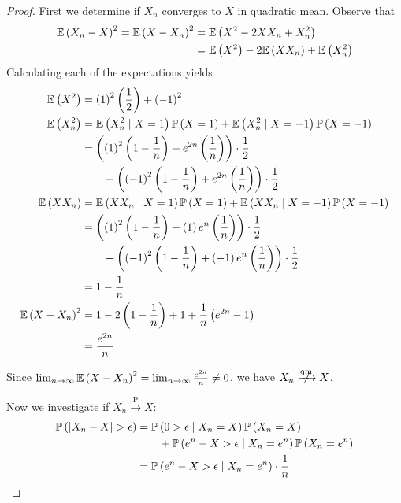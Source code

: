 \documentclass[a4paper]{article}
\begin{document}
\begin{proof}[Proof] 
First we determine if \(X_{n}\) converges to \(X\) in quadratic mean. Observe that
\begin{align*}
	\mathbb{E}\left( X_{n} - X \right)^{2} = \mathbb{E}\left( X - X_{n} \right)^{2} 	& = \mathbb{E}\left( X^{2} - 2 X X_{n} + X^{2}_{n} \right) \\	
	 & = \mathbb{E}\left( X^{2} \right) - 2 \mathbb{E}\left( X X_{n} \right) + \mathbb{E}\left( X^{2}_{n} \right) \\ 
\end{align*}
Calculating each of the expectations yields
\begin{align*}
	\mathbb{E}\left( X^{2} \right) & = \left( 1 \right)^{2} \left( \frac{1}{2} \right) + \left( -1 \right)^{2}  \\
	\mathbb{E}\left( X^{2}_{n} \right) & = \mathbb{E}\left( X^{2}_{n} \mid X = 1 \right) \mathbb{P}\left( X = 1 \right) + \mathbb{E}\left( X^{2}_{n} \mid X = -1 \right) \mathbb{P}\left( X = -1 \right) \\
		   & = \left( \left( 1 \right)^{2} \left( 1 - \frac{1}{n} \right) + e^{2n} \left( \frac{1}{n} \right)  \right) \cdot \frac{1}{2} \\
		   & \qquad + \left( \left( -1 \right)^{2} \left( 1 - \frac{1}{n} \right) + e^{2n} \left( \frac{1}{n} \right)  \right) \cdot \frac{1}{2} \\
	\mathbb{E}\left( X X_{n} \right) & = \mathbb{E}\left( X X_{n} \mid X = 1 \right) \mathbb{P}\left( X = 1 \right) + \mathbb{E}\left( X X_{n} \mid X = -1 \right) \mathbb{P}\left( X = -1 \right) \\
	 & = \left( \left( 1 \right)^{2} \left( 1 - \frac{1}{n} \right) + \left( 1 \right) e^{n} \left( \frac{1}{n} \right)  \right) \cdot \frac{1}{2} \\
	 & \qquad + \left( \left( -1 \right)^{2} \left( 1 - \frac{1}{n} \right)  + \left( -1 \right) e^{n} \left( \frac{1}{n} \right)  \right) \cdot \frac{1}{2} \\
	 & = 1 - \frac{1}{n} \\
	\mathbb{E}\left( X - X_{n} \right)^{2} & = 1 - 2 \left( 1 - \frac{1}{n} \right) + 1 + \frac{1}{n} \left( e^{2n} - 1 \right) \\
	 & = \frac{e^{2n}}{n}
\end{align*}

Since \(\lim_{n \to \infty} \mathbb{E}\left( X - X_{n} \right)^{2} = \lim_{n \to \infty} \frac{e^{2n}}{n} \neq 0 \), we have \(X_{n} \centernot{\xrightarrow{\text{qm}}} X \). 

Now we investigate if \(X_{n} \xrightarrow{\text{ P }} X\):
\begin{align*}
	\Prob\left( \abs{X_{n} - X} > \epsilon  \right) & = \Prob\left( 0 > \epsilon \mid X_{n} = X \right) \Prob\left( X_{n} = X \right) \\
	 & \qquad + \Prob\left( e^{n} - X > \epsilon \mid X_{n} = e^{n} \right) \Prob\left( X_{n} = e^{n} \right) \\
	 & = \Prob\left( e^{n} - X > \epsilon \mid X_{n} = e^{n} \right) \cdot \frac{1}{n} \\ 
\end{align*}


\end{proof}
\end{document}
